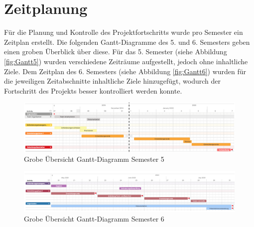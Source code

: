 \section{Zeitplanung}
Für die Planung und Kontrolle des Projektfortschritts wurde pro Semester ein Zeitplan erstellt.
Die folgenden Gantt-Diagramme des 5. und 6. Semesters geben einen groben Überblick über diese.
Für das 5. Semester (siehe Abbildung \vref{fig:Gantt5}) wurden verschiedene Zeiträume aufgestellt, jedoch ohne inhaltliche Ziele.
Dem Zeitplan des 6. Semesters (siehe Abbildung \vref{fig:Gantt6}) wurden für die jeweiligen Zeitabschnitte inhaltliche Ziele hinzugefügt, wodurch der Fortschritt des Projekts besser kontrolliert werden konnte.

\begin{figure}[H]
	\centering 
	\includegraphics[width=\textwidth]{img/GanttSemester5.png}
	\captionsetup{format=hang}
	\caption[Grobe Übersicht Gantt-Diagramm Semester 5]{\label{fig:Gantt5}Grobe Übersicht Gantt-Diagramm Semester 5}
\end{figure}

\begin{figure}[H]
	\centering 
	\includegraphics[width=\textwidth]{img/GanttSemester6.png}
	\captionsetup{format=hang}
	\caption[Grobe Übersicht Gantt-Diagramm Semester 6]{\label{fig:Gantt6}Grobe Übersicht Gantt-Diagramm Semester 6}
\end{figure}
